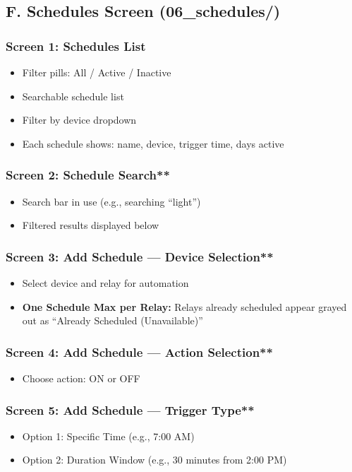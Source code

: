 \subsection{F. Schedules Screen (06\_schedules/)}

\subsubsection{Screen 1: Schedules List}
\begin{itemize}
    \item Filter pills: All / Active / Inactive
    \item Searchable schedule list
    \item Filter by device dropdown
    \item Each schedule shows: name, device, trigger time, days active
\end{itemize}

\subsubsection{Screen 2: Schedule Search**}
\begin{itemize}
    \item Search bar in use (e.g., searching ``light'')
    \item Filtered results displayed below
\end{itemize}

\subsubsection{Screen 3: Add Schedule — Device Selection**}
\begin{itemize}
    \item Select device and relay for automation
    \item \textbf{One Schedule Max per Relay:} Relays already scheduled appear grayed out as ``Already Scheduled (Unavailable)''
\end{itemize}

\subsubsection{Screen 4: Add Schedule — Action Selection**}
\begin{itemize}
    \item Choose action: ON or OFF
\end{itemize}

\subsubsection{Screen 5: Add Schedule — Trigger Type**}
\begin{itemize}
    \item Option 1: Specific Time (e.g., 7:00 AM)
    \item Option 2: Duration Window (e.g., 30 minutes from 2:00 PM)
\end{itemize}

